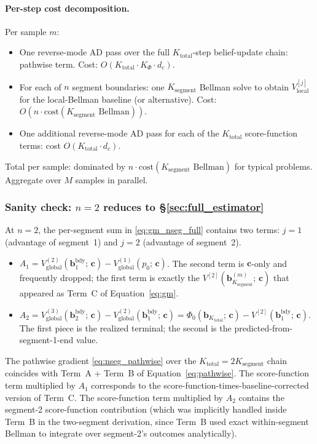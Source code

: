 \documentclass[11pt,a4paper]{article}
\newcommand{\bc}{\bm{c}}
\newcommand{\bb}{\bm{b}}
\begin{document}
\paragraph{Per-step cost decomposition.}  Per sample $m$:
\begin{itemize}[nosep, leftmargin=2em]
\item One reverse-mode AD pass over the full $K_\mathrm{total}$-step belief-update chain:
      pathwise term.  Cost: $O(K_\mathrm{total} \cdot K_\Phi \cdot d_c)$.
\item For each of $n$ segment boundaries: one $K_\mathrm{segment}$ Bellman solve to obtain
      $V^{[j]}_\mathrm{local}$ for the local-Bellman baseline (or alternative).  Cost:
      $O(n \cdot \mathrm{cost}(K_\mathrm{segment} \text{ Bellman}))$.
\item One additional reverse-mode AD pass for each of the $K_\mathrm{total}$ score-function
      terms: cost $O(K_\mathrm{total} \cdot d_c)$.
\end{itemize}
Total per sample: dominated by $n \cdot \mathrm{cost}(K_\mathrm{segment} \text{ Bellman})$ for
typical problems.  Aggregate over $M$ samples in parallel.

\subsubsection{Sanity check: \texorpdfstring{$n = 2$}{n=2} reduces to \S\ref{sec:full_estimator}}

At $n = 2$, the per-segment sum in \eqref{eq:gm_nseg_full} contains two terms:
$j = 1$ (advantage of segment~1) and $j = 2$ (advantage of segment~2).
\begin{itemize}[nosep, leftmargin=2em]
\item $A_1 = V_{\mathrm{global}}^{(2)}(\bb^{\mathrm{bdy}}_1;\, \bc) - V_{\mathrm{global}}^{(1)}(p_0;\, \bc)$.
      The second term is $\bc$-only and frequently dropped; the first term is exactly the
      $V^{[2]}(\bb_{K_\mathrm{segment}}^{(m)};\, \bc)$ that appeared as Term~C of
      Equation~\eqref{eq:gm}.
\item $A_2 = V_{\mathrm{global}}^{(3)}(\bb^{\mathrm{bdy}}_2;\, \bc) - V_{\mathrm{global}}^{(2)}(\bb^{\mathrm{bdy}}_1;\, \bc) = \Phi_0(\bb_{K_\mathrm{total}};\, \bc) - V^{[2]}(\bb^{\mathrm{bdy}}_1;\, \bc)$.
      The first piece is the realized terminal; the second is the predicted-from-segment-1-end value.
\end{itemize}
The pathwise gradient \eqref{eq:nseg_pathwise} over the $K_\mathrm{total} = 2 K_\mathrm{segment}$
chain coincides with Term~A + Term~B of Equation~\eqref{eq:pathwise}.  The score-function term
multiplied by $A_1$ corresponds to the score-function-times-baseline-corrected version of
Term~C.  The score-function term multiplied by $A_2$ contains the segment-2 score-function
contribution (which was implicitly handled inside Term~B in the two-segment derivation, since
Term~B used exact within-segment Bellman to integrate over segment-2's outcomes analytically).
\end{document}
